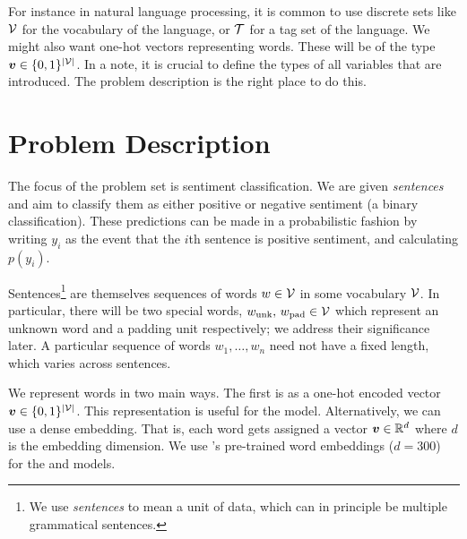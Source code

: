 \documentclass[11pt]{article}
\begin{document}
For instance in natural language processing, it is common to use
discrete sets like $\mathcal{V}$ for the vocabulary of the language, or $\mathcal{T}$ for a
tag set of the language.  We might also want one-hot vectors
representing words. These will be of the type
$\boldsymbol{v} \in \{0,1\}^{|\mathcal{V}|}$. In a note, it is crucial to define the
types of all variables that are introduced. The problem description is the
right place to do this.




\section{Problem Description}

The focus of the problem set is sentiment classification. We are given
\emph{sentences} and aim to classify them as either positive or negative
sentiment (a binary classification). These predictions can be made in a
probabilistic fashion by writing $y_i$ as the event that the $i$th sentence is
positive sentiment, and calculating $p(y_i)$.

Sentences\footnote{We use \emph{sentences} to mean a unit of data, which can in
principle be multiple grammatical sentences.} are themselves sequences of words
$w \in \mathcal{V}$ in some vocabulary
$\mathcal{V}$. In particular, there will be two special words, $w_\text{unk},\,
w_\text{pad} \in \mathcal{V}$ which represent an unknown word and a padding unit
respectively; we address their significance later. A particular sequence of
words $w_1, \ldots, w_n$ need not have a fixed length, which varies
across sentences. 

We represent words in two main ways. The first is as a one-hot encoded vector
$\boldsymbol{v} \in \{0,1\}^{|\mathcal{V}|}$. This representation is useful for the
 model. Alternatively, we can use a dense embedding.
That is, each word gets assigned a vector $\boldsymbol{v} \in \mathbb{R}^d$ where $d$ is
the embedding dimension. We use \citet{mikolov2013efficient}'s pre-trained word
embeddings ($d=300$) for the  and 
models.
\end{document}
